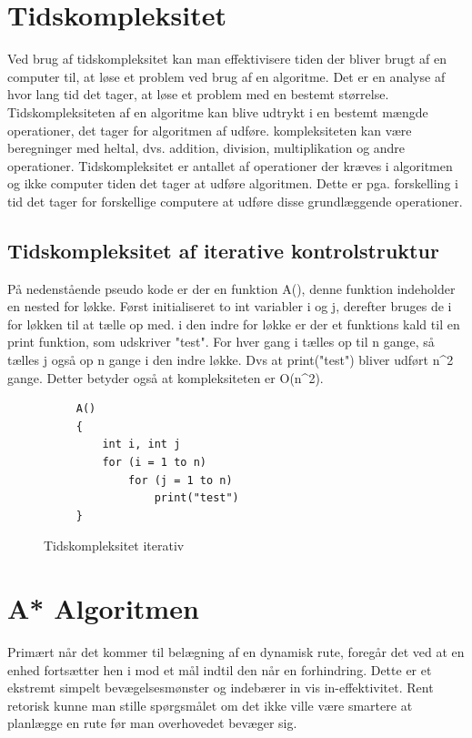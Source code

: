 \section{Tidskompleksitet}
Ved brug af tidskompleksitet kan man effektivisere tiden der bliver brugt af en computer til, at løse et problem ved brug af en algoritme. Det er en analyse af hvor lang tid det tager, at løse et problem med en bestemt størrelse. Tidskompleksiteten af en algoritme kan blive udtrykt i en bestemt mængde operationer, det tager for algoritmen af udføre. kompleksiteten kan være beregninger med heltal, dvs. addition, division, multiplikation og andre operationer. Tidskompleksitet er antallet af operationer der kræves i algoritmen og ikke computer tiden det tager at udføre algoritmen. Dette er pga. forskelling i tid det tager for forskellige computere at udføre disse grundlæggende operationer.

\subsection{Tidskompleksitet af iterative kontrolstruktur}
På nedenstående pseudo kode er der en funktion A(), denne funktion indeholder en nested for løkke. Først initialiseret to int variabler i og j, derefter bruges de i for løkken til at tælle op med. i den indre for løkke er der et funktions kald til en print funktion, som udskriver "test". For hver gang i tælles op til n gange, så tælles j også op n gange i den indre løkke.  Dvs at print("test") bliver udført n^2 gange. Detter betyder også at kompleksiteten er O(n^2).

\begin{figure}[H]
\begin{lstlisting}
     A()
     {
         int i, int j
         for (i = 1 to n)
             for (j = 1 to n)
                 print("test") 
     }
\end{lstlisting}
\caption{Tidskompleksitet iterativ}\label{Tidskompleksitet}
\end{figure}



\section{A* Algoritmen}
Primært når det kommer til belægning af en dynamisk rute, foregår det ved at en enhed fortsætter hen i mod et mål indtil den når en forhindring. Dette er et ekstremt simpelt bevægelsesmønster og indebærer in vis in-effektivitet. Rent retorisk kunne man stille spørgsmålet om det ikke ville være smartere at planlægge en rute før man overhovedet bevæger sig.

